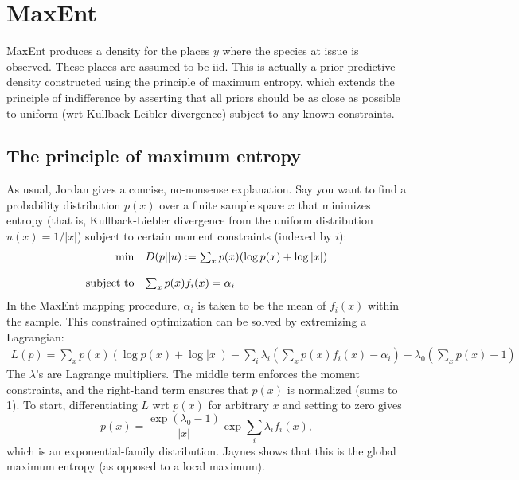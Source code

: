 
\section{MaxEnt} 
\label{sec:maxent}

MaxEnt produces a density for the places $y$ where the species at issue is observed. These places are assumed to be iid. This is actually a prior predictive density constructed using the principle of maximum entropy, which extends the principle of indifference by asserting that all priors should be as close as possible to uniform (wrt Kullback-Leibler divergence) subject to any known constraints. 

\subsection{The principle of maximum entropy}

As usual, Jordan \cite{Jordan:ch19} gives a concise, no-nonsense explanation. Say you want to find a probability distribution $p(x)$ over a finite sample space $x$ that minimizes entropy (that is, Kullback-Liebler divergence from the uniform distribution $u(x)=1/|x|$) subject to certain moment constraints (indexed by $i$):
\begin{equation}
    \label{eq:maxent-goal} 
    \begin{array}{rl}
        \min & D(p||u) := \sum_x p(x)(\log p(x) + \log |x|)\\\\
        \textup{subject to} & \sum_x p(x) f_i(x) = \alpha_i         
    \end{array}
\end{equation}
In the MaxEnt mapping procedure, $\alpha_i$ is taken to be the mean of $f_i(x)$ within the sample. This constrained optimization can be solved by extremizing a Lagrangian:
\begin{eqnarray*}
    L(p) = \sum_x p(x)(\log p(x) + \log |x|) - \sum_i \lambda_i \left(\sum_x p(x)f_i(x)-\alpha_i \right) - \lambda_0 \left(\sum_x p(x)-1\right)
\end{eqnarray*}
The $\lambda$'s are Lagrange multipliers. The middle term enforces the moment constraints, and the right-hand term ensures that $p(x)$ is normalized (sums to 1). To start, differentiating $L$ wrt $p(x)$ for arbitrary $x$ and setting to zero gives
\begin{equation}
    \label{eq:exponential-family}
    p(x) = \frac{\exp{(\lambda_0-1)}}{|x|}\exp{\sum_i\lambda_if_i(x)},
\end{equation}
which is an exponential-family distribution. Jaynes \cite{Jaynes:ch11} shows that this is the global maximum entropy (as opposed to a local maximum).

